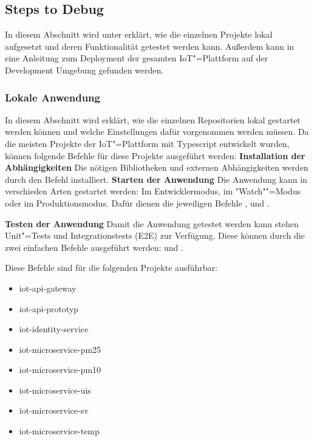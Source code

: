 \subsection{Steps to Debug}
\label{sec:iot:stepstodebug}
In diesem Abschnitt wird unter  erklärt, wie die einzelnen Projekte lokal aufgesetzt und deren Funktionalität getestet werden kann. Außerdem kann in  eine Anleitung zum Deployment der gesamten IoT"=Plattform auf der Development Umgebung gefunden werden.
\subsubsection{Lokale Anwendung}
\label{sec:iot:lokal}
In diesem Abschnitt wird erklärt, wie die einzelnen Repositorien lokal gestartet werden können und welche Einstellungen dafür vorgenommen werden müssen. Da die meisten Projekte der IoT"=Plattform mit Typescript entwickelt wurden, können folgende Befehle für diese Projekte ausgeführt werden: \newline 
\textbf{Installation der Abhängigkeiten} \newline
Die nötigen Bibliotheken und externen Abhängigkeiten werden durch den Befehl  installiert.
\textbf{Starten der Anwendung}\newline
Die Anwendung kann in verschieden Arten gestartet werden: Im Entwicklermodus, im "Watch""=Modus oder im Produktionsmodus. Dafür dienen die jeweiligen Befehle ,  und . 

\textbf{Testen der Anwendung}\newline
Damit die Anwendung getestet werden kann stehen Unit"=Tests und Integrationstests (E2E) zur Verfügung. 
Diese können durch die zwei einfachen Befehle ausgeführt werden:  und .

Diese Befehle sind für die folgenden Projekte ausführbar: 
\begin{itemize}
	\item iot-api-gateway
	\item iot-api-prototyp
	\item iot-identity-service
	\item iot-microservice-pm25
	\item iot-microservice-pm10
	\item iot-microservice-uis
	\item iot-microservice-sv
	\item iot-microservice-temp
\end{itemize}

